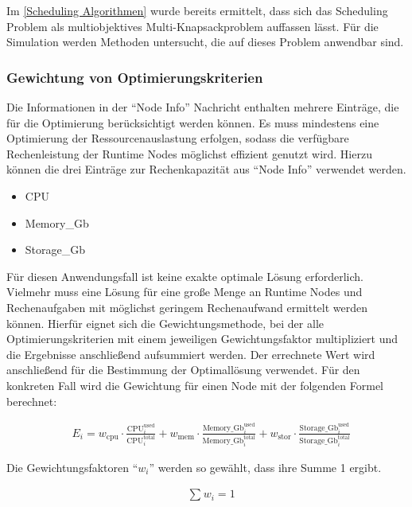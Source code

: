 Im \autoref{Scheduling Algorithmen} wurde bereits ermittelt, dass sich das Scheduling Problem als multiobjektives Multi-Knapsackproblem auffassen lässt. Für die Simulation werden Methoden untersucht, die auf dieses Problem anwendbar sind.

\subsubsection{Gewichtung von Optimierungskriterien}

Die Informationen in der \enquote{Node Info} Nachricht enthalten mehrere Einträge, die für die Optimierung berücksichtigt werden können. Es muss mindestens eine Optimierung der Ressourcenauslastung erfolgen, sodass die verfügbare Rechenleistung der Runtime Nodes möglichst effizient genutzt wird. Hierzu können die drei Einträge zur Rechenkapazität aus \enquote{Node Info} verwendet werden.

\begin{itemize}
	\item CPU
	\item Memory\_Gb
	\item Storage\_Gb
\end{itemize}

Für diesen Anwendungsfall ist keine exakte optimale Lösung erforderlich. Vielmehr muss eine Lösung für eine große Menge an Runtime Nodes und Rechenaufgaben mit möglichst geringem Rechenaufwand ermittelt werden können. Hierfür eignet sich die Gewichtungsmethode, bei der alle Optimierungskriterien mit einem jeweiligen Gewichtungsfaktor multipliziert und die Ergebnisse anschließend aufsummiert werden. Der errechnete Wert wird anschließend für die Bestimmung der Optimallösung verwendet. Für den konkreten Fall wird die Gewichtung für einen Node mit der folgenden Formel berechnet:

\begin{align}
	& E_i = w_{\text{cpu}} \cdot \frac{\text{CPU}_i^{\text{used}}}{\text{CPU}_i^{\text{total}}}
    + w_{\text{mem}} \cdot \frac{\text{Memory\_Gb}_i^{\text{used}}}{\text{Memory\_Gb}_i^{\text{total}}}
    + w_{\text{stor}} \cdot \frac{\text{Storage\_Gb}_i^{\text{used}}}{\text{Storage\_Gb}_i^{\text{total}}}
\end{align}

Die Gewichtungsfaktoren \enquote{$w_i$} werden so gewählt, dass ihre Summe 1 ergibt.

\begin{align}
	& \sum_{}^{} w_i = 1
\end{align}

